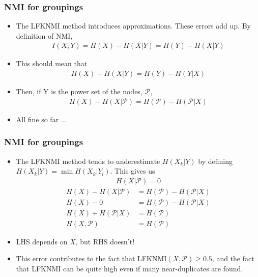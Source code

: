\documentclass{beamer}
\begin{document}
\newcommand{\Power}[0]{\mathcal{P}}

\frame
{
  \frametitle{NMI for groupings}

  \begin{itemize}
	\item The LFKNMI method introduces approximations. These errors add up. By definition of NMI, %
		\begin{align*}
				I(X;Y) = H(X) - H(X|Y) = H(Y) - H(X|Y) 
		\end{align*}
	\item This should mean that
		\begin{align*}
				H(X) - H(X|Y) = H(Y) - H(Y|X) 
		\end{align*}
	\item Then, if Y is the power set of the nodes, $\mathcal{P}$,
		\begin{align*}
				H(X) - H(X|\Power) = H(\Power) - H(\Power|X) 
		\end{align*}
	\item All fine so far ...
  \end{itemize}
}


\frame
{
  \frametitle{NMI for groupings}

  \begin{itemize}
	\item The LFKNMI method tends to underestimate $H(X_k|Y)$ by defining $H(X_k|Y) = \min H(X_k|Y_l)$. This gives us
		\begin{align*}
				H(X|\Power) = 0
		\end{align*}
		\begin{align*}
				H(X) - H(X|\Power) &= H(\Power) - H(\Power|X)               \\
				H(X) -   0     &= H(\Power) - H(\Power|X)                            \\
				H(X) + H(\Power|X) &= H(\Power)                             \\
				H(X,\Power) &= H(\Power)  
		\end{align*}
		\item LHS depends on $X$, but RHS doesn't!
		\item This error contributes to the fact that LFKNMI$(X,\Power) \geq 0.5$, and the fact that LFKNMI can be quite high even if many near-duplicates are found.
  \end{itemize}
}
\end{document}
